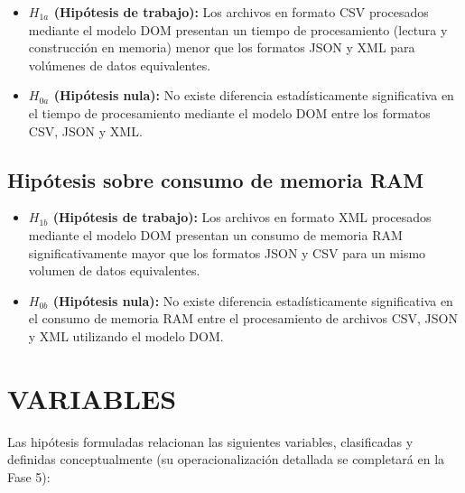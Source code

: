 \begin{itemize}
    \item \textbf{$H_{1a}$ (Hipótesis de trabajo):} Los archivos en formato CSV procesados mediante el modelo DOM presentan un tiempo de procesamiento (lectura y construcción en memoria) menor que los formatos JSON y XML para volúmenes de datos equivalentes.
    \item \textbf{$H_{0a}$ (Hipótesis nula):} No existe diferencia estadísticamente significativa en el tiempo de procesamiento mediante el modelo DOM entre los formatos CSV, JSON y XML.
\end{itemize}

\subsection{Hipótesis sobre consumo de memoria RAM}

\begin{itemize}
    \item \textbf{$H_{1b}$ (Hipótesis de trabajo):} Los archivos en formato XML procesados mediante el modelo DOM presentan un consumo de memoria RAM significativamente mayor que los formatos JSON y CSV para un mismo volumen de datos equivalentes.
    \item \textbf{$H_{0b}$ (Hipótesis nula):} No existe diferencia estadísticamente significativa en el consumo de memoria RAM entre el procesamiento de archivos CSV, JSON y XML utilizando el modelo DOM.
\end{itemize}

\section{VARIABLES}

Las hipótesis formuladas relacionan las siguientes variables, clasificadas y definidas conceptualmente (su operacionalización detallada se completará en la Fase 5):

